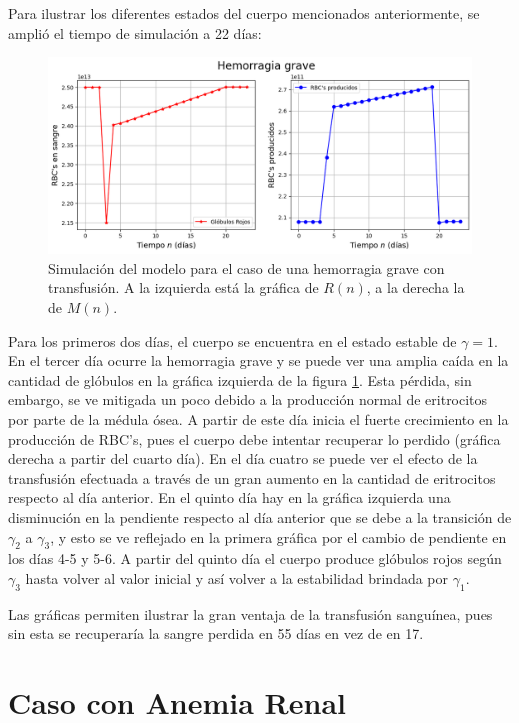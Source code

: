 Para ilustrar los diferentes estados del cuerpo mencionados anteriormente, se amplió el tiempo de simulación a 22 días: 

\begin{figure}[H]
    \centering
    \captionsetup{justification=centering}
    \includegraphics[scale=0.534]{figures/HemoGrave.png}
    \caption{Simulación del modelo para el caso de una hemorragia grave con transfusión. A la izquierda está la gráfica de $R(n)$, a la derecha la de $M(n)$.}
    \label{sec:variaciones:fig:HemoGrave}
\end{figure}

Para los primeros dos días, el cuerpo se encuentra en el estado estable de $\gamma = 1$. En el tercer día ocurre la hemorragia grave y se puede ver una amplia caída en la cantidad de glóbulos en la gráfica izquierda de la figura \ref{sec:variaciones:fig:HemoGrave}. Esta pérdida, sin embargo, se ve mitigada un poco debido a la producción normal de eritrocitos por parte de la médula ósea. A partir de este día inicia el fuerte crecimiento en la producción de RBC's, pues el cuerpo debe intentar recuperar lo perdido (gráfica derecha a partir del cuarto día). En el día cuatro se puede ver el efecto de la transfusión efectuada a través de un gran aumento en la cantidad de eritrocitos respecto al día anterior. En el quinto día hay en la gráfica izquierda una disminución en la pendiente respecto al día anterior que se debe a la transición de $\gamma_2$ a $\gamma_3$, y esto se ve reflejado en la primera gráfica por el cambio de pendiente en los días 4-5 y 5-6. A partir del quinto día el cuerpo produce glóbulos rojos según $\gamma_3$ hasta volver al valor inicial y así volver a la estabilidad brindada por $\gamma_1$.

Las gráficas permiten ilustrar la gran ventaja de la transfusión sanguínea, pues sin esta se recuperaría la sangre perdida en 55 días en vez de en 17.

\section{Caso con Anemia Renal}\label{Sec:variaciones:anemia}

